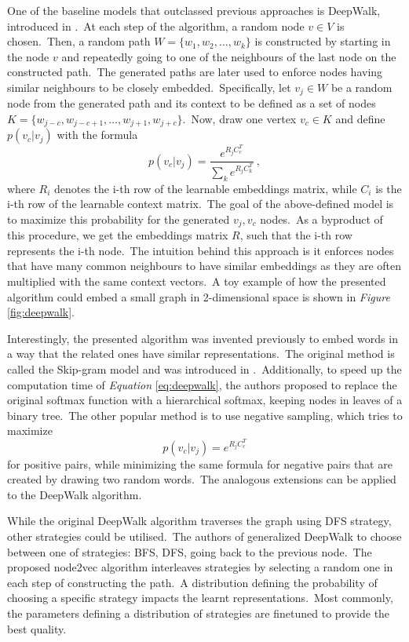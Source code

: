 \documentclass[longabstract, english, mgr]{iithesis}
\theoremstyle{default_theorem_style}\newtheorem{theorem}{Theorem}
\theoremstyle{default_theorem_style}\newtheorem{definition}{Definition}
\begin{document}
One of the baseline models that outclassed previous approaches is DeepWalk, introduced in \cite{deepwalk}.\ At each step
of the algorithm, a random node $v \in V$ is chosen.\ Then, a random path $W = \{w_1, w_2, \dots, w_k\}$ is
constructed by starting in the node $v$ and repeatedly going to one of the neighbours of the last node on the
constructed path.\ The generated paths are later used to enforce nodes having similar neighbours to be closely
embedded.\ Specifically, let $v_j \in W$ be a random node from the generated path and its context to be defined as
a set of nodes $K = \{w_{j - c}, w_{j - c + 1}, \dots, w_{j + 1}, w_{j + c}\}$.\ Now, draw one vertex $v_c \in K$
and define $p(v_c | v_j)$ with the formula
\begin{equation}\label{eq:deepwalk}
p(v_c | v_j) = \frac{e^{R_j C_c^T}}{\sum_k e^{R_j C_k^T}}\ ,
\end{equation}
where $R_i$ denotes the i-th row of the learnable embeddings matrix, while $C_i$ is the i-th row of the learnable
context matrix.\ The goal of the above-defined model is to maximize this probability for the generated $v_j, v_c$
nodes.\ As a byproduct of this procedure, we get the embeddings matrix $R$, such that the i-th row represents the
i-th node.\ The intuition behind this approach is it enforces nodes that have many common neighbours to have similar
embeddings as they are often multiplied with the same context vectors.\ A toy example of how the presented algorithm
could embed a small graph in 2-dimensional space is shown in \textit{Figure} \ref{fig:deepwalk}.\newline

\noindent Interestingly, the presented algorithm was invented previously to embed words in a way that the related ones
have similar representations.\ The original method is called the Skip-gram model and was introduced in
\cite{skipgram}.\ Additionally, to speed up the computation time of \textit{Equation} \ref{eq:deepwalk}, the authors
proposed to replace the original softmax function with a hierarchical softmax, keeping nodes in leaves of a binary
tree.\ The other popular method is to use negative sampling, which tries to maximize
$$
p(v_c | v_j) = e^{R_j C_c^T}
$$
for positive pairs, while minimizing the same formula for negative pairs that are created by drawing two random
words.\ The analogous extensions can be applied to the DeepWalk algorithm.\newline

\noindent While the original DeepWalk algorithm traverses the graph using DFS strategy, other strategies could
be utilised.\ The authors of \cite{node2vec} generalized DeepWalk to choose between one of strategies: BFS, DFS,
going back to the previous node.\ The proposed node2vec algorithm interleaves strategies by selecting a random one in
each step of constructing the path.\ A distribution defining the probability of choosing a specific strategy impacts the
learnt representations.\ Most commonly, the parameters defining a distribution of strategies are finetuned to provide
the best quality.\newline
\end{document}

